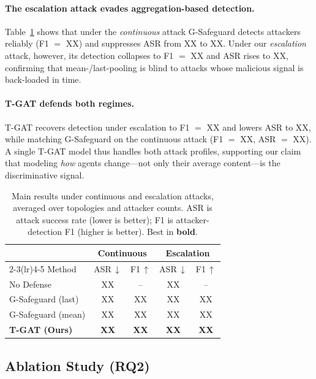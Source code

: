 \paragraph{The escalation attack evades aggregation-based detection.}
Table~\ref{tab:main} shows that under the \emph{continuous} attack G-Safeguard
detects attackers reliably (F1 $=$ XX) and suppresses ASR from XX to XX. Under our
\emph{escalation} attack, however, its detection collapses to F1 $=$ XX and ASR
rises to XX, confirming that mean-/last-pooling is blind to attacks whose
malicious signal is back-loaded in time.

\paragraph{T-GAT defends both regimes.}
T-GAT recovers detection under escalation to F1 $=$ XX and lowers ASR to XX, while
matching G-Safeguard on the continuous attack (F1 $=$ XX, ASR $=$ XX). A single
T-GAT model thus handles both attack profiles, supporting our claim that modeling
\emph{how} agents change---not only their average content---is the discriminative
signal.

\begin{table}[t]
\centering
\setlength{\tabcolsep}{4pt}
\begin{tabular}{lcccc}
\toprule
& \multicolumn{2}{c}{\textbf{Continuous}} & \multicolumn{2}{c}{\textbf{Escalation}} \\
\cmidrule(lr){2-3}\cmidrule(lr){4-5}
Method & ASR\,$\downarrow$ & F1\,$\uparrow$ & ASR\,$\downarrow$ & F1\,$\uparrow$ \\
\midrule
No Defense              & XX & --  & XX & --  \\
G-Safeguard (last)      & XX & XX & XX & XX \\
G-Safeguard (mean)      & XX & XX & XX & XX \\
\textbf{T-GAT (Ours)}   & \textbf{XX} & \textbf{XX} & \textbf{XX} & \textbf{XX} \\
\bottomrule
\end{tabular}
\caption{Main results under continuous and escalation attacks, averaged over
topologies and attacker counts. ASR is attack success rate (lower is better); F1
is attacker-detection F1 (higher is better). Best in \textbf{bold}.}
\label{tab:main}
\end{table}

\subsection{Ablation Study (RQ2)}
\label{sec:exp_ablation}

